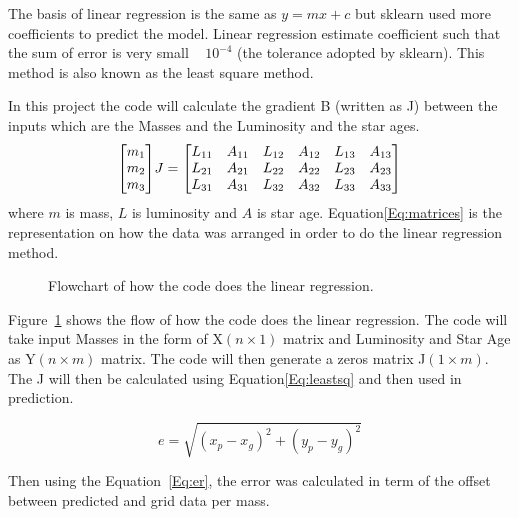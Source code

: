 The basis of linear regression is the same as $y= mx+c$ but sklearn used more coefficients to predict the model. Linear regression estimate  coefficient such that the sum of error is very small ~  $10^{-4}$ (the tolerance adopted by sklearn). This method is also known as the least square method.

In this project the code will calculate the gradient B (written as J)  between the inputs which are the Masses and the Luminosity and the star ages.
\begin{equation}
    \mqty[
        m_{1}\\m_{2}\\m_{3}  
    ]
    J
    =
    \mqty[
        L_{11}&A_{11}&L_{12}&A_{12}&L_{13}&A_{13}\\
        L_{21}&A_{21}&L_{22}&A_{22}&L_{23}&A_{23}\\
        L_{31}&A_{31}&L_{32}&A_{32}&L_{33}&A_{33}
    ]
    \label{Eq:matrices}
\end{equation}
where $m$ is mass, $L$ is luminosity and $A$ is star age.
Equation\ref{Eq:matrices} is the representation on how the data was arranged in order to do the linear regression method. 

\begin{figure}[H]
    \centering

    \caption{Flowchart of how the code does the linear regression.}
    \label{fig:flow}
\end{figure}

Figure~\ref{fig:flow} shows the flow of how the code does the linear regression. The code will take input Masses in the form of X$(n\times1)$ matrix and Luminosity and Star Age as Y$(n\times m)$ matrix. The code will then generate a zeros matrix J$(1\times m)$. The J will then be calculated using Equation\ref{Eq:leastsq} and then used in prediction.

\begin{equation}
    e=\sqrt{(x_p-x_g)^2+(y_p-y_g)^2}
    \label{Eq:er}
\end{equation}

Then using the Equation~\ref{Eq:er}, the error was calculated in term of the offset between predicted and grid data per mass.